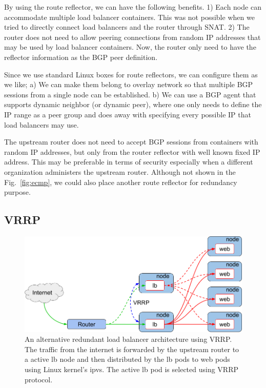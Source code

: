By using the route reflector, we can have the following benefits.
1) Each node can accommodate multiple load balancer containers. This was not possible when we tried to directly connect load balancers and the router through SNAT.
2) The router does not need to allow peering connections from random IP addresses that may be used by load balancer containers. Now, the router only need to have the reflector information as the BGP peer definition.

Since we use standard Linux boxes for route reflectors, we can configure them as we like;
a) We can make them belong to overlay network so that multiple BGP sessions from a single node can be established.
b) We can use a BGP agent that supports dynamic neighbor (or dynamic peer), where one only needs to define the IP range as a peer group and does away with specifying every possible IP that load balancers may use.

The upstream router does not need to accept BGP sessions from containers with random IP addresses, but only from the router reflector with well known fixed IP address. This may be preferable in terms of security especially when a different organization administers the upstream router.
Although not shown in the Fig.~\ref{fig:ecmp}, we could also place another route reflector for redundancy purpose.

\subsection{VRRP}\label{Subsec:Redundancy with VRRP}

\begin{figure}[tb]
\centering
\includegraphics[width=0.8\columnwidth]{Figs/vrrp.png}
\caption{
  An alternative redundant load balancer architecture using VRRP. \\ %
  The traffic from the internet is forwarded by the upstream router to a active lb node and then distributed by the lb pods to web pods using Linux kernel's ipvs.
  The active lb pod is selected using VRRP protocol.
}
\label{fig:vrrp}
\end{figure}

